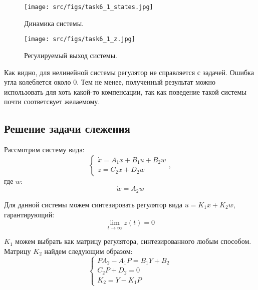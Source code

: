 \begin{figure}[ht!]
        \centering
        \texttt{[image: src/figs/task6\_1\_states.jpg]}
        \caption{Динамика системы.}
        \label{fig:task6_1_states}
\end{figure}

\begin{figure}[ht!]
        \centering
        \texttt{[image: src/figs/task6\_1\_z.jpg]}
        \caption{Регулируемый выход системы.}
        \label{fig:task6_1_z}
\end{figure}

Как видно, для нелинейной системы регулятор не справляется с задачей. Ошибка угла колеблется около 0. Тем не менее, полученный результат можно использовать для хоть какой-то компенсации, так как поведение такой системы почти соответсвует желаемому.
\FloatBarrier

\subsection{Решение задачи слежения}
Рассмотрим систему вида:
\[
    \begin{cases}
        \dot{x} = A_1x + B_1u + B_2w \\
        z = C_2x + D_2w
    \end{cases},
\]
где $w$:
\[
    \dot{w} = A_2w
\]

Для данной системы можем синтезировать регулятор вида $u = K_1x + K_2w$, гарантирующий:
\begin{equation*}
    \lim_{t\to\infty} z(t) = 0
\end{equation*}

$K_1$ можем выбрать как матрицу регулятора, синтезированного любым способом. Матрицу $K_2$ найдем следующим образом:
\[
    \begin{cases}
        PA_2 - A_1P = B_1Y + B_2\\
        C_2P + D_2 = 0 \\
        K_2 = Y - K_1P
    \end{cases}
\]

